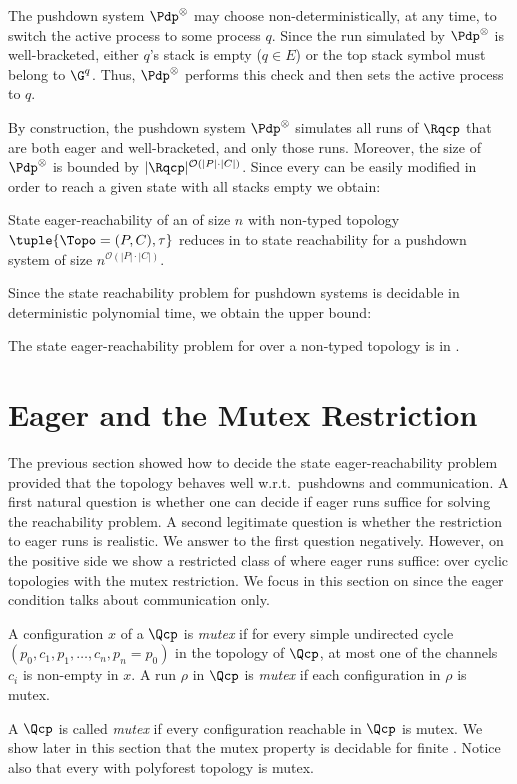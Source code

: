 \documentclass{LMCS}
\newenvironment{definition}{\begin{defi}}{\end{defi}}
\newenvironment{proposition}{\begin{prop}}{\end{prop}}
\begin{document}
The pushdown system $\Pdp^\otimes$ may choose
non-deterministically, at any
time, to switch the active process to
some process $q$.  
Since the run simulated by $\Pdp^\otimes$ is well-bracketed, either
$q$'s stack is empty ($q \in E$) or 
the top stack symbol must belong to $\G^q$. Thus,  $\Pdp^\otimes$
performs this check and then sets  the active process to $q$.


By construction, the pushdown system $\Pdp^\otimes$ simulates all runs
of $\Rqcp$ that are both eager and well-bracketed, and only those
runs. Moreover, the size of $\Pdp^\otimes$ is bounded by
$|\Rqcp|^{\mathcal{O}(|P|\cdot |C|)}$. Since every \rqcp can be easily
modified in order to reach a given state with all stacks empty we
obtain:

\begin{proposition}\label{prop:confl-reduction}
  State eager-reachability of an \rqcp of size $n$ with
  non-\converging typed topology $\tuple{\Topo=(P,C),\tau}$ 
  reduces in \dexptime to state reachability for a pushdown system of
  size $n^{\mathcal{O}(|P|\cdot |C|)}$.
\end{proposition}


Since the state reachability problem for pushdown systems is decidable in
deterministic polynomial time, we obtain the upper bound:

\begin{proposition}\label{prop:eager-upperb}
  The state eager-reachability problem for \rqcp over a
  non-\converging typed topology  is in \dexptime.
\end{proposition}
 \section{Eager \qcp and the Mutex Restriction}
\label{sect:mutex}

The previous section showed how to decide the state
eager-reachability problem provided that the topology behaves well
w.r.t.~pushdowns and communication. A
first natural question is whether one can decide if eager runs
suffice for solving the reachability problem. A second legitimate
question is whether the restriction to eager runs is realistic. We
answer to the first question negatively.  However, on the positive
side we show a restricted class of \qcp where eager runs suffice:
\qcp over cyclic topologies with the mutex restriction. We focus in
this section
on \qcp since the eager condition talks about communication only.

\begin{definition}
   A configuration $x$ of a \qcp $\Qcp$ is \emph{mutex} if for every simple
   undirected cycle $(p_0,c_1,p_1,\ldots,c_n,p_n=p_0)$ in the topology of
   $\Qcp$, at most one of the channels $c_i$ is non-empty in $x$.
   A run $\rho$ in $\Qcp$ is \emph{mutex} if each configuration in
   $\rho$ is mutex.
\end{definition}
A \qcp $\Qcp$ is called \emph{mutex} if every configuration reachable in
$\Qcp$ is mutex.
We show later in this section that the mutex property is decidable for
finite \qcp.
Notice also that every \qcp with polyforest topology is mutex.
\end{document}
